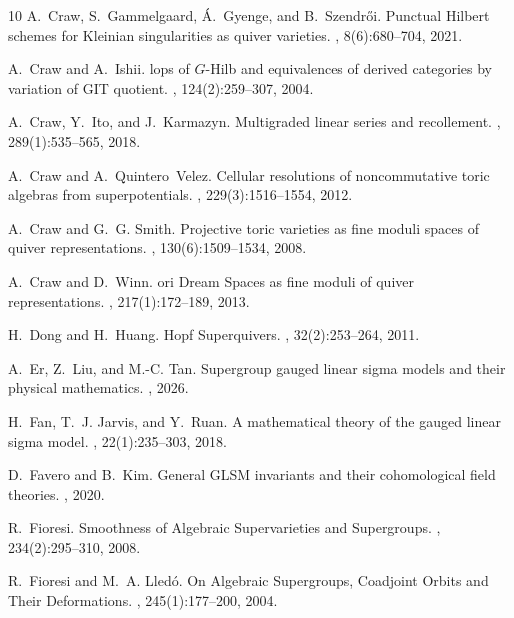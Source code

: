 \documentclass[11pt,a4paper,reqno,noamsfonts]{amsart}
\numberwithin{equation}{section}
\theoremstyle{definition}
\theoremstyle{remark}
\begin{document}
\begin{thebibliography}{10}
A.~Craw, S.~Gammelgaard, {\'A}.~Gyenge, and B.~Szendr{\H o}i.
\newblock Punctual {H}ilbert schemes for {K}leinian singularities as quiver
  varieties.
, 8(6):680--704, 2021.

A.~Craw and A.~Ishii.
lops of {$G$}-{H}ilb and equivalences of derived categories by
  variation of {GIT} quotient.
, 124(2):259--307, 2004.

A.~Craw, Y.~Ito, and J.~Karmazyn.
\newblock Multigraded linear series and recollement.
, 289(1):535--565, 2018.

A.~Craw and A.~Quintero~Velez.
\newblock Cellular resolutions of noncommutative toric algebras from
  superpotentials.
, 229(3):1516--1554, 2012.

A.~Craw and G.~G. Smith.
\newblock Projective toric varieties as fine moduli spaces of quiver
  representations.
, 130(6):1509--1534, 2008.

A.~Craw and D.~Winn.
ori {D}ream {S}paces as fine moduli of quiver representations.
, 217(1):172--189, 2013.

H.~Dong and H.~Huang.
\newblock Hopf {S}uperquivers.
, 32(2):253--264, 2011.

A.~Er, Z.~Liu, and M.-C. Tan.
\newblock Supergroup gauged linear sigma models and their physical mathematics.
, 2026.

H.~Fan, T.~J. Jarvis, and Y.~Ruan.
\newblock A mathematical theory of the gauged linear sigma model.
, 22(1):235--303, 2018.

D.~Favero and B.~Kim.
\newblock General {GLSM} invariants and their cohomological field theories.
, 2020.

R.~Fioresi.
\newblock Smoothness of {A}lgebraic {S}upervarieties and {S}upergroups.
, 234(2):295--310, 2008.

R.~Fioresi and M.~A. Lled{\'o}.
\newblock On {A}lgebraic {S}upergroups, {C}oadjoint {O}rbits and {T}heir
  {D}eformations.
, 245(1):177--200, 2004.


\end{thebibliography}
\end{document}
